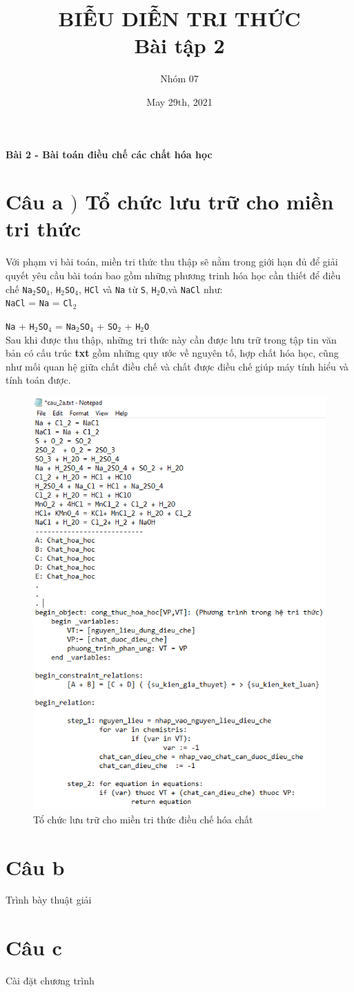\documentclass[a4paper]{article}
\title{BIỄU DIỄN TRI THỨC\\ Bài tập 2}
\author{Nhóm 07}
\date{May 29th, 2021}
\begin{document}
	\maketitle
	\begin{center}
		\Large{\textbf{Bài 2 - Bài toán điều chế các chất hóa học}}
	\end{center}
	\section*{Câu a $)$ Tổ chức lưu trữ cho miền tri thức} 
	
	Với phạm vi bài toán, miền tri thức thu thập sẽ nằm trong giới hạn đủ để giải quyết yêu cầu bài toán bao gồm những phương trinh hóa học cần thiết để điều chế \texttt{Na$_2$SO$_4$}, \texttt{H$_2$SO$_4$}, \texttt{HCl} và \texttt{Na} từ \texttt{S}, \texttt{H$_2$O},và \texttt{NaCl} như:\\
	
	
	\texttt{NaCl} = \texttt{Na} = \texttt{Cl$_2$}  
	
	
	\texttt{Na} + \texttt{H$_2$SO$_4$} = \texttt{Na$_2$SO$_4$} + \texttt{SO$_2$} + \texttt{H$_2$O}\\
	
	Sau khi được thu thập, những tri thức này cần được lưu trữ trong tập tin văn bản có cấu trúc \textbf{txt} gồm những quy ước về nguyên tố, hợp chất hóa học, cũng như mối quan hệ giữa chất điều chế và chất được điều chế giúp máy tính hiểu và tính toán được.
		
	\begin{figure}[h]
	\centering
	\includegraphics[width=.46\linewidth]{2a_luutru.PNG}  
	\caption{Tổ chức lưu trữ cho miền tri thức điều chế hóa chất}
	\label{}
	\end{figure}


	\section*{Câu b}
	Trình bày thuật giải
	
	\section*{Câu c}
	Cài đặt chương trình
\end{document}
